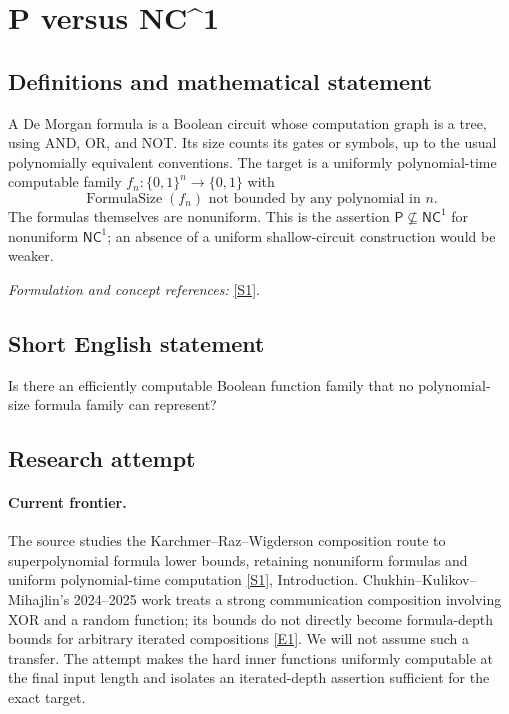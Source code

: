 \documentclass[11pt,a4paper]{article}
\newcommand{\sref}[2]{\hyperlink{source:#1:#2}{[S#2]}}
\newcommand{\eref}[2]{\hyperlink{extra:#1:#2}{[E#2]}}
\newif\ifshowcatalogue
\newcommand{\cataloguescope}[1]{\ifshowcatalogue
 \paragraph{Exact scope in the supplied catalogue.}
 \begin{quote}\small #1\end{quote}\fi}
\numberwithin{equation}{section}
\begin{document}
\setcounter{section}{0}
\clearpage
\section*{\texorpdfstring{P versus NC\textasciicircum{}1}{P versus NC\textasciicircum{}1}}\label{30006707}
\subsection{Definitions and mathematical statement}
A De Morgan formula is a Boolean circuit whose computation graph is a tree, using AND, OR, and NOT. Its size counts its gates or symbols, up to the usual polynomially equivalent conventions. The target is a uniformly polynomial-time computable family $f_n:\{0,1\}^n\to\{0,1\}$ with
\[
 \operatorname{FormulaSize}(f_n)\text{ not bounded by any polynomial in }n.
\]
The formulas themselves are nonuniform. This is the assertion $\mathsf P\nsubseteq\mathsf{NC}^1$ for nonuniform $\mathsf{NC}^1$; an absence of a uniform shallow-circuit construction would be weaker.
\par\smallskip\textit{Formulation and concept references:} \sref{30006707}{1}.
\cataloguescope{Exhibit a Boolean function family computable in deterministic polynomial time whose nonuniform De Morgan formula size is superpolynomial; equivalently, prove that P is not contained in nonuniform NC\textasciicircum{}1.}
\subsection{Short English statement}
Is there an efficiently computable Boolean function family that no polynomial-size formula family can represent?
\subsection{Research attempt}

\paragraph{Current frontier.}
The source studies the Karchmer--Raz--Wigderson composition route to superpolynomial formula lower bounds, retaining nonuniform formulas and uniform polynomial-time computation \sref{30006707}{1}, Introduction. Chukhin--Kulikov--Mihajlin's 2024--2025 work treats a strong communication composition involving XOR and a random function; its bounds do not directly become formula-depth bounds for arbitrary iterated compositions \eref{30006707}{1}. We will not assume such a transfer. The attempt makes the hard inner functions uniformly computable at the final input length and isolates an iterated-depth assertion sufficient for the exact target.
\end{document}
